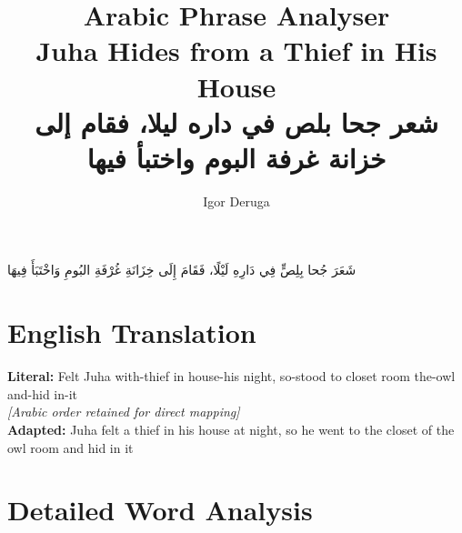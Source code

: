 \documentclass[letterpaper,12pt]{article}
\begin{document}
\title{\textbf{\Large Arabic Phrase Analyser}\\
\large Juha Hides from a Thief in His House\\
\normalsize \textarabic{شعر جحا بلص في داره ليلا، فقام إلى خزانة غرفة البوم واختبأ فيها}}
\author{Igor Deruga}
\date{}
\maketitle

\begin{tcolorbox}[colback=boxcolor,colframe=headercolor,title=\textbf{Arabic Phrase with Full Diactrics},breakable]
\centering
\textarabic{شَعَرَ جُحا بِلِصٍّ فِي دَارِهِ لَيْلًا، فَقَامَ إِلَى خِزَانَةِ غُرْفَةِ البُومِ وَاخْتَبَأَ فِيهَا}
\end{tcolorbox}

\section{English Translation}
\begin{tcolorbox}[colback=white,colframe=accentcolor,breakable]
\textbf{Literal:} Felt Juha with-thief in house-his night, so-stood to closet room the-owl and-hid in-it \\
\textit{[Arabic order retained for direct mapping]}\\[0.5em]
\textbf{Adapted:} Juha felt a thief in his house at night, so he went to the closet of the owl room and hid in it
\end{tcolorbox}

\section{Detailed Word Analysis}
\end{document}
